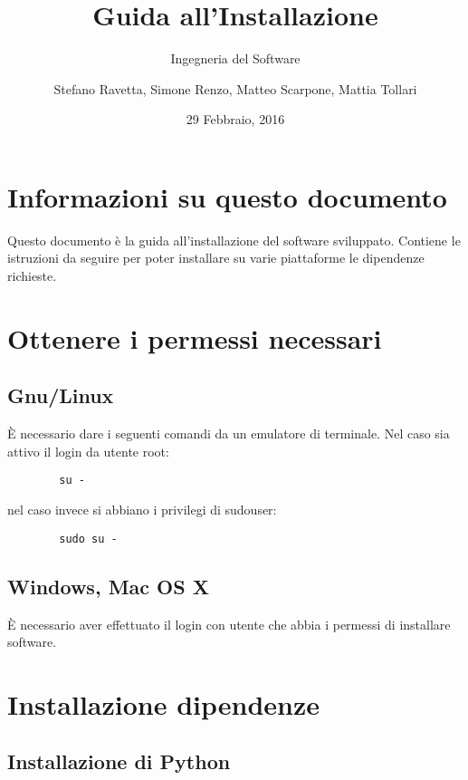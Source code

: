 \documentclass[12pt]{scrartcl}
\title{Guida all'Installazione}
\subtitle{Ingegneria del Software}
\author{Stefano Ravetta, Simone Renzo, Matteo Scarpone, Mattia Tollari}
\date{29 Febbraio, 2016}
\begin{document}
\maketitle
\section{Informazioni su questo documento}
    Questo documento \`e la guida all'installazione del software sviluppato.
    Contiene le istruzioni da seguire per poter installare su varie piattaforme
    le dipendenze richieste.
\section{Ottenere i permessi necessari}
    \subsection{Gnu/Linux}
        \`E necessario dare i seguenti comandi da un emulatore di terminale.
        Nel caso sia attivo il login da utente root:
        \begin{verbatim}
        su -
        \end{verbatim}
        nel caso invece si abbiano i privilegi di sudouser:
        \begin{verbatim}
        sudo su -
        \end{verbatim}
    \subsection{Windows, Mac OS X}
        \`E necessario aver effettuato il login con utente che abbia i permessi
        di installare software.
\section{Installazione dipendenze}
\subsection{Installazione di Python}
    
\end{document}
